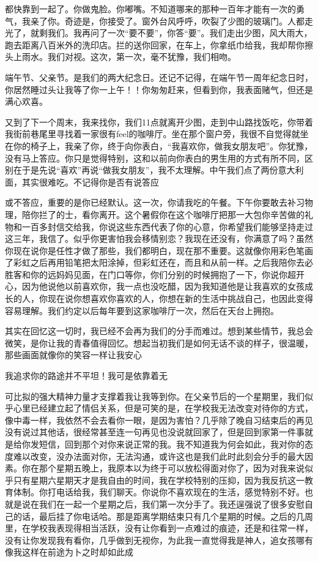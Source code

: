 \documentclass{article}
\begin{document}
\newpage 

都快靠到一起了。你做鬼脸。你嘟嘴。不知道哪来的那种一百年才能有一次的勇气，我亲了你。奇迹是，你接受了。窗外台风呼呼，吹裂了少图的玻璃门。人都走光了，就剩我们。我再问了一次“要不要”，你答“要”。我们走出少图，风大雨大，跑去距离八百米外的洗印店。拦的送你回家，在车上，你拿纸巾给我，我却帮你擦头上雨水。我们对视。这次，第一次，毫不犹豫，我们相吻。

端午节、父亲节。是我们的两大纪念日。还记不记得，在端午节一周年纪念日时，你居然睡过头让我等了你一上午！！你匆匆赶来，但看到你，我表面赌气，但还是满心欢喜。

又到了下一个周末，我来找你，我们11点就离开少图，走到中山路找饭吃，你带着我街前巷尾里寻找着一家很有feel的咖啡厅。坐在那个窗户旁，我很不自觉得就坐在你的椅子上，我亲了你，终于向你表白，“我喜欢你，做我女朋友吧”。你犹豫，没有马上答应。你只是觉得特别，这和以前向你表白的男生用的方式有所不同，区别在于是先说“喜欢”再说“做我女朋友”，我不太理解。中午我们点了两份意大利面，其实很难吃。不记得你是否有说答应

\newpage 

或不答应，重要的是你已经默认。这一次，你请我吃的午餐。下午你要敢去补习物理，陪你拦了的士，看你离开。这个暑假你在这个咖啡厅把那一大包你辛苦做的礼物和一百多封信交给我，你说这些东西代表了你的心意，你希望我们能够坚持走过这三年，我信了。似乎你更害怕我会移情别恋？我现在还没有，你满意了吗？虽然你现在说你是任性才做了那些，我们都明白，现在那不重要。这就像你用彩色笔画了彩虹之后再用铅笔把太阳涂掉，但彩虹还在，而且和从前一样。之后我陪你去必胜客和你的远妈妈见面，在门口等你，你们分别的时候拥抱了一下，你说你超开心，因为他说他以前喜欢你，我一点也没吃醋，因为我知道他是让我喜欢的女孩成长的人，你现在说你想喜欢你喜欢的人，你想在新的生活中挑战自己，也因此变得容易理解。我们约定以后每年要到这家咖啡厅一次，然后在天台上拥抱。

其实在回忆这一切时，我已经不会再为我们的分手而难过。想到某些情节，我总会微笑，是你让我的青春值得回忆。想起当初我们是如何无话不谈的样子，很温暖，那些画面就像你的笑容一样让我安心

我追求你的路途并不平坦！我可是依靠着无

\newpage 

可比拟的强大精神力量才支撑着我让我等到你。在父亲节后的一个星期里，我们似乎心里已经建立起了情侣关系，但是可笑的是，在学校我无法改变对待你的方式，像中毒一样，我依然不会去看你一眼，是因为害怕？几乎除了晚自习结束后的再见没有说过其他话，很经常甚至连一句再见也没说就回家了，但是回到家第一件事就是给你发短信，回到那个对你来说正常的我。我不知道我为何会如此，我对你的态度难以改变，没办法面对你，无法沟通，或许这也是我们此时此刻会分手的最大因素。你在那个星期五晚上，我原本以为终于可以放松得面对你了，因为对我来说似乎只有星期六星期天才是我自由的时间，我在学校特别的压抑，因为我反抗这一教育体制。你打电话给我，我们聊天。你说你不喜欢现在的生活，感觉特别不好。也就是说在我们在一起一个星期之后，我们第一次分手了。我还逞强说了很多安慰自己的话，最后挂了你电话哈。那是距离学期结束只有几个星期的时候。之后的几周里，在学校我表现得相当活跃，没有让你看到一点难过的痕迹，还是和往常一样，没有让你发现我有看你，几乎做到无视你，为此我一直觉得我是神人，追女孩哪有像我这样在前途为卜之时却如此成
\end{document}
